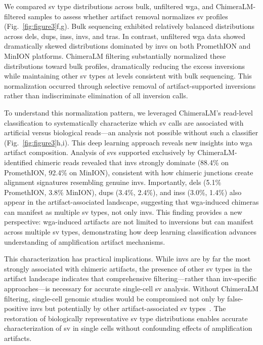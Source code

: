 \documentclass[pdflatex,sn-nature,lineno]{sn-jnl}%
\theoremstyle{thmstyleone}%
\theoremstyle{thmstyletwo}%
\theoremstyle{thmstylethree}%
\begin{document}
We compared \gls{sv} type distributions across bulk, unfiltered \gls{wga}, and ChimeraLM-filtered samples to assess whether artifact removal normalizes \gls{sv} profiles (Fig.~\ref{fig:figure3}f,g).
Bulk sequencing exhibited relatively balanced distributions across \glspl{del}, \glspl{dup}, \glspl{ins}, \glspl{inv}, and \glspl{tra}.
In contrast, unfiltered \gls{wga} data showed dramatically skewed distributions dominated by \glspl{inv} on both PromethION and MinION platforms.
ChimeraLM filtering substantially normalized these distributions toward bulk profiles, dramatically reducing the excess inversions while maintaining other \gls{sv} types at levels consistent with bulk sequencing.
This normalization occurred through selective removal of artifact-supported inversions rather than indiscriminate elimination of all inversion calls.

To understand this normalization pattern, we leveraged ChimeraLM's read-level classification to systematically characterize which \gls{sv} calls are associated with artificial versus biological reads—an analysis not possible without such a classifier (Fig.~\ref{fig:figure3}h,i).
This deep learning approach reveals new insights into \gls{wga} artifact composition.
Analysis of \glspl{sv} supported exclusively by ChimeraLM-identified chimeric reads revealed that \glspl{inv} strongly dominate (88.4\% on PromethION, 92.4\% on MinION), consistent with how chimeric junctions create alignment signatures resembling genuine \glspl{inv}.
Importantly, \glspl{del} (5.1\% PromethION, 3.8\% MinION), \glspl{dup} (3.4\%, 2.4\%), and \glspl{ins} (3.0\%, 1.4\%) also appear in the artifact-associated landscape, suggesting that \gls{wga}-induced chimeras can manifest as multiple \gls{sv} types, not only \glspl{inv}.
This finding provides a new perspective: \gls{wga}-induced artifacts are not limited to inversions but can manifest across multiple \gls{sv} types, demonstrating how deep learning classification advances understanding of amplification artifact mechanisms.

This characterization has practical implications.
While \glspl{inv} are by far the most strongly associated with chimeric artifacts, the presence of other \gls{sv} types in the artifact landscape indicates that comprehensive filtering—rather than \gls{inv}-specific approaches—is necessary for accurate single-cell \gls{sv} analysis.
Without ChimeraLM filtering, single-cell genomic studies would be compromised not only by false-positive \glspl{inv} but potentially by other artifact-associated \gls{sv} types~\cite{kosugi2019comprehensive, mahmoud2019structural}. 
The restoration of biologically representative \gls{sv} type distributions enables accurate characterization of \gls{sv} in single cells without confounding effects of amplification artifacts.
\end{document}
